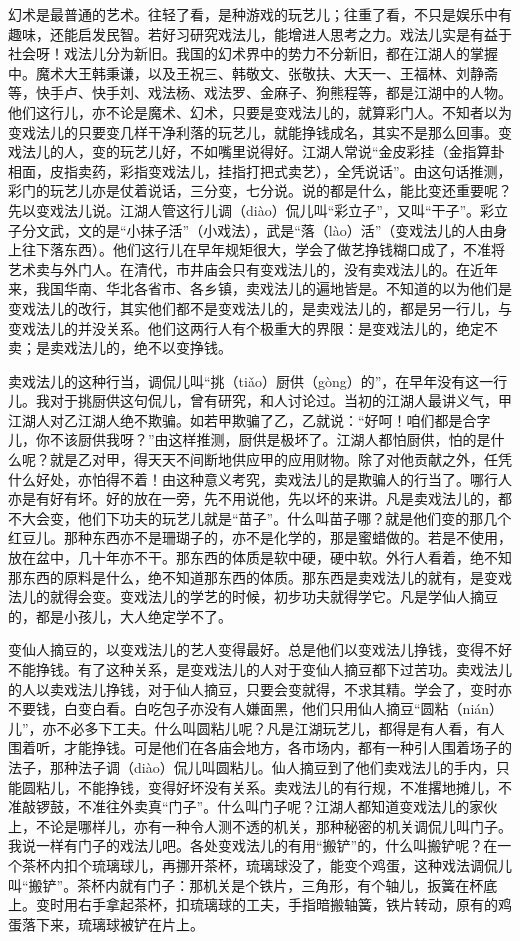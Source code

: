 \documentclass[12pt,UTF8]{ctexbook}
\begin{document}
幻术是最普通的艺术。往轻了看，是种游戏的玩艺儿；往重了看，不只是娱乐中有趣味，还能启发民智。若好习研究戏法儿，能增进人思考之力。戏法儿实是有益于社会呀！戏法儿分为新旧。我国的幻术界中的势力不分新旧，都在江湖人的掌握中。魔术大王韩秉谦，以及王祝三、韩敬文、张敬扶、大天一、王福林、刘静斋等，快手卢、快手刘、戏法杨、戏法罗、金麻子、狗熊程等，都是江湖中的人物。他们这行儿，亦不论是魔术、幻术，只要是变戏法儿的，就算彩门人。不知者以为变戏法儿的只要变几样干净利落的玩艺儿，就能挣钱成名，其实不是那么回事。变戏法儿的人，变的玩艺儿好，不如嘴里说得好。江湖人常说“金皮彩挂（金指算卦相面，皮指卖药，彩指变戏法儿，挂指打把式卖艺），全凭说话”。由这句话推测，彩门的玩艺儿亦是仗着说话，三分变，七分说。说的都是什么，能比变还重要呢？先以变戏法儿说。江湖人管这行儿调（diào）侃儿叫“彩立子”，又叫“干子”。彩立子分文武，文的是“小抹子活”（小戏法），武是“落（lào）活”（变戏法儿的人由身上往下落东西）。他们这行儿在早年规矩很大，学会了做艺挣钱糊口成了，不准将艺术卖与外门人。在清代，市井庙会只有变戏法儿的，没有卖戏法儿的。在近年来，我国华南、华北各省市、各乡镇，卖戏法儿的遍地皆是。不知道的以为他们是变戏法儿的改行，其实他们都不是变戏法儿的，是卖戏法儿的，都是另一行儿，与变戏法儿的并没关系。他们这两行人有个极重大的界限：是变戏法儿的，绝定不卖；是卖戏法儿的，绝不以变挣钱。

卖戏法儿的这种行当，调侃儿叫“挑（tiǎo）厨供（gòng）的”，在早年没有这一行儿。我对于挑厨供这句侃儿，曾有研究，和人讨论过。当初的江湖人最讲义气，甲江湖人对乙江湖人绝不欺骗。如若甲欺骗了乙，乙就说：“好呵！咱们都是合字儿，你不该厨供我呀？”由这样推测，厨供是极坏了。江湖人都怕厨供，怕的是什么呢？就是乙对甲，得天天不间断地供应甲的应用财物。除了对他贡献之外，任凭什么好处，亦怕得不着！由这种意义考究，卖戏法儿的是欺骗人的行当了。哪行人亦是有好有坏。好的放在一旁，先不用说他，先以坏的来讲。凡是卖戏法儿的，都不大会变，他们下功夫的玩艺儿就是“苗子”。什么叫苗子哪？就是他们变的那几个红豆儿。那种东西亦不是珊瑚子的，亦不是化学的，那是蜜蜡做的。若是不使用，放在盆中，几十年亦不干。那东西的体质是软中硬，硬中软。外行人看着，绝不知那东西的原料是什么，绝不知道那东西的体质。那东西是卖戏法儿的就有，是变戏法儿的就得会变。变戏法儿的学艺的时候，初步功夫就得学它。凡是学仙人摘豆的，都是小孩儿，大人绝定学不了。

变仙人摘豆的，以变戏法儿的艺人变得最好。总是他们以变戏法儿挣钱，变得不好不能挣钱。有了这种关系，是变戏法儿的人对于变仙人摘豆都下过苦功。卖戏法儿的人以卖戏法儿挣钱，对于仙人摘豆，只要会变就得，不求其精。学会了，变时亦不要钱，白变白看。白吃包子亦没有人嫌面黑，他们只用仙人摘豆“圆粘（nián）儿”，亦不必多下工夫。什么叫圆粘儿呢？凡是江湖玩艺儿，都得是有人看，有人围着听，才能挣钱。可是他们在各庙会地方，各市场内，都有一种引人围着场子的法子，那种法子调（diào）侃儿叫圆粘儿。仙人摘豆到了他们卖戏法儿的手内，只能圆粘儿，不能挣钱，变得好坏没有关系。卖戏法儿的有行规，不准撂地摊儿，不准敲锣鼓，不准往外卖真“门子”。什么叫门子呢？江湖人都知道变戏法儿的家伙上，不论是哪样儿，亦有一种令人测不透的机关，那种秘密的机关调侃儿叫门子。我说一样有门子的戏法儿吧。各处变戏法儿的有用“搬铲”的，什么叫搬铲呢？在一个茶杯内扣个琉璃球儿，再挪开茶杯，琉璃球没了，能变个鸡蛋，这种戏法调侃儿叫“搬铲”。茶杯内就有门子：那机关是个铁片，三角形，有个轴儿，扳簧在杯底上。变时用右手拿起茶杯，扣琉璃球的工夫，手指暗搬轴簧，铁片转动，原有的鸡蛋落下来，琉璃球被铲在片上。
\end{document}
